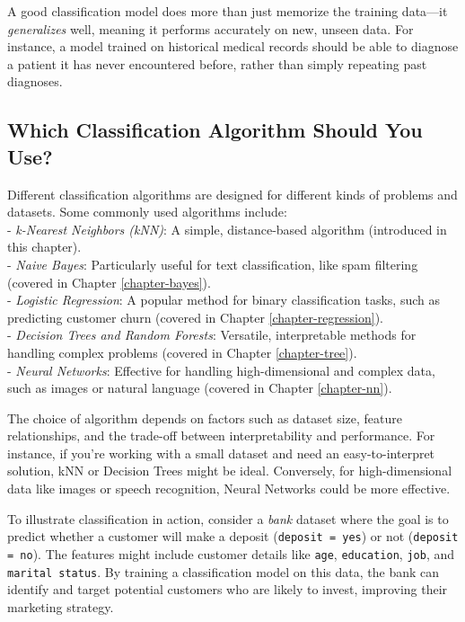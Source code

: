 \documentclass[
  11pt,
]{book}
\newcommand{\passthrough}[1]{#1}
\theoremstyle{definition}
\theoremstyle{definition}
\theoremstyle{definition}
\theoremstyle{definition}
\theoremstyle{remark}
\begin{document}
A good classification model does more than just memorize the training data---it \emph{generalizes} well, meaning it performs accurately on new, unseen data. For instance, a model trained on historical medical records should be able to diagnose a patient it has never encountered before, rather than simply repeating past diagnoses.

\subsection*{Which Classification Algorithm Should You Use?}\label{which-classification-algorithm-should-you-use}


Different classification algorithms are designed for different kinds of problems and datasets. Some commonly used algorithms include:\\
- \emph{k-Nearest Neighbors (kNN)}: A simple, distance-based algorithm (introduced in this chapter).\\
- \emph{Naive Bayes}: Particularly useful for text classification, like spam filtering (covered in Chapter \ref{chapter-bayes}).\\
- \emph{Logistic Regression}: A popular method for binary classification tasks, such as predicting customer churn (covered in Chapter \ref{chapter-regression}).\\
- \emph{Decision Trees and Random Forests}: Versatile, interpretable methods for handling complex problems (covered in Chapter \ref{chapter-tree}).\\
- \emph{Neural Networks}: Effective for handling high-dimensional and complex data, such as images or natural language (covered in Chapter \ref{chapter-nn}).

The choice of algorithm depends on factors such as dataset size, feature relationships, and the trade-off between interpretability and performance. For instance, if you're working with a small dataset and need an easy-to-interpret solution, kNN or Decision Trees might be ideal. Conversely, for high-dimensional data like images or speech recognition, Neural Networks could be more effective.

To illustrate classification in action, consider a \emph{bank} dataset where the goal is to predict whether a customer will make a deposit (\passthrough{\lstinline!deposit = yes!}) or not (\passthrough{\lstinline!deposit = no!}). The features might include customer details like \passthrough{\lstinline!age!}, \passthrough{\lstinline!education!}, \passthrough{\lstinline!job!}, and \passthrough{\lstinline!marital status!}. By training a classification model on this data, the bank can identify and target potential customers who are likely to invest, improving their marketing strategy.
\end{document}
